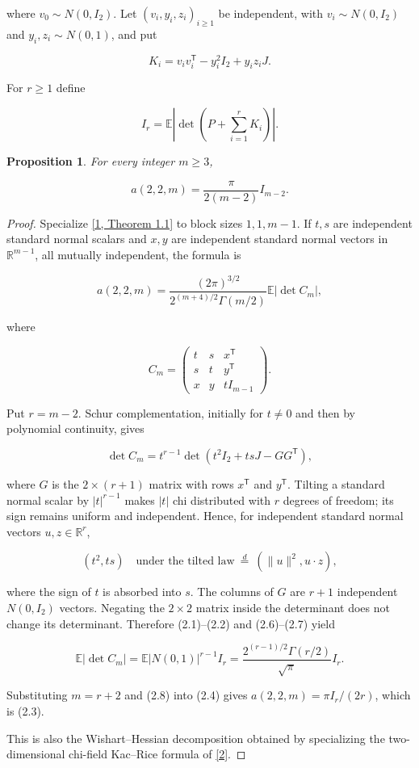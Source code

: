 \documentclass[11pt]{article}
\newtheorem{proposition}[theorem]{Proposition}
\begin{document}
where $v_0\sim N(0,I_2)$.  Let $(v_i,y_i,z_i)_{i\ge1}$ be independent, with $v_i\sim N(0,I_2)$ and $y_i,z_i\sim N(0,1)$, and put

\[
K_i=v_iv_i^{\mathsf T}-y_i^2I_2+y_iz_iJ.                 \tag{2.1}
\]

For $r\ge1$ define

\[
I_r=\mathbb E\left|\det\left(P+\sum_{i=1}^rK_i\right)\right|. \tag{2.2}
\]

\begin{proposition}
For every integer $m\ge3$,

\[
a(2,2,m)=\frac{\pi}{2(m-2)}I_{m-2}.                     \tag{2.3}
\]

\end{proposition}

\begin{proof}
Specialize \hyperlink{ref1}{[1, Theorem 1.1]} to block sizes $1,1,m-1$.  If $t,s$ are independent standard normal scalars and $x,y$ are independent standard normal vectors in $\mathbb R^{m-1}$, all mutually independent, the formula is

\[
a(2,2,m)=
\frac{(2\pi)^{3/2}}{2^{(m+4)/2}\Gamma(m/2)}
\mathbb E|\det C_m|,                                    \tag{2.4}
\]

where

\[
C_m=
\begin{pmatrix}
t&s&x^{\mathsf T}\\
s&t&y^{\mathsf T}\\
x&y&tI_{m-1}
\end{pmatrix}.                                           \tag{2.5}
\]

Put $r=m-2$.  Schur complementation, initially for $t\ne0$ and then by polynomial continuity, gives

\[
\det C_m=t^{r-1}
\det\!\left(t^2I_2+tsJ-GG^{\mathsf T}\right),           \tag{2.6}
\]

where $G$ is the $2\times(r+1)$ matrix with rows $x^{\mathsf T}$ and $y^{\mathsf T}$.  Tilting a standard normal scalar by $|t|^{r-1}$ makes $|t|$ chi distributed with $r$ degrees of freedom; its sign remains uniform and independent.  Hence, for independent standard normal vectors $u,z\in\mathbb R^r$,

\[
(t^2,ts)\quad\text{under the tilted law}
\ \overset d=\ (\|u\|^2,u\mathbin\cdot z),              \tag{2.7}
\]

where the sign of $t$ is absorbed into $s$.  The columns of $G$ are $r+1$ independent $N(0,I_2)$ vectors.  Negating the $2\times2$ matrix inside the determinant does not change its determinant.  Therefore (2.1)--(2.2) and (2.6)--(2.7) yield

\[
\mathbb E|\det C_m|
=\mathbb E|N(0,1)|^{r-1}I_r
=\frac{2^{(r-1)/2}\Gamma(r/2)}{\sqrt\pi}I_r.            \tag{2.8}
\]

Substituting $m=r+2$ and (2.8) into (2.4) gives $a(2,2,m)=\pi I_r/(2r)$, which is (2.3).

This is also the Wishart--Hessian decomposition obtained by specializing the two-dimensional chi-field Kac--Rice formula of \hyperlink{ref2}{[2]}.

\end{proof}
\end{document}
